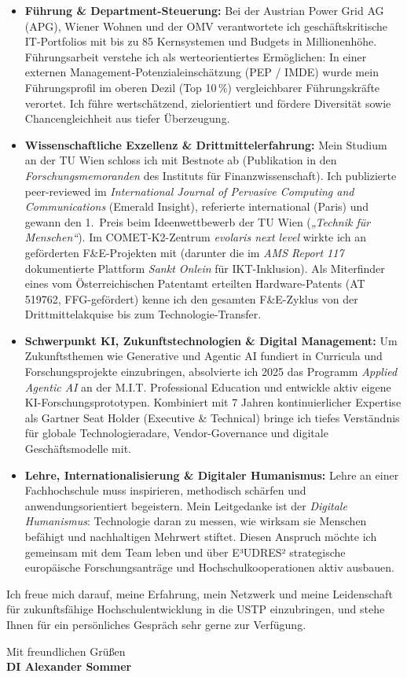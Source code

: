 \documentclass[10.5pt]{article}
\begin{document}
\begin{itemize}\setlength{\itemsep}{1.5pt}\setlength{\parskip}{0pt}
  \item \textbf{Führung \& Department-Steuerung:} Bei der Austrian Power Grid AG (APG), Wiener Wohnen und der OMV verantwortete ich geschäftskritische IT-Portfolios mit bis zu 85 Kernsystemen und Budgets in Millionenhöhe. Führungsarbeit verstehe ich als werteorientiertes Ermöglichen: In einer externen Management-Potenzialeinschätzung (PEP / IMDE) wurde mein Führungsprofil im oberen Dezil (Top 10\,\%) vergleichbarer Führungskräfte verortet. Ich führe wertschätzend, zielorientiert und fördere Diversität sowie Chancengleichheit aus tiefer Überzeugung.

  \item \textbf{Wissenschaftliche Exzellenz \& Drittmittelerfahrung:} Mein Studium an der TU Wien schloss ich mit Bestnote ab (Publikation in den \emph{Forschungsmemoranden} des Instituts für Finanzwissenschaft). Ich publizierte peer-reviewed im \emph{International Journal of Pervasive Computing and Communications} (Emerald Insight), referierte international (Paris) und gewann den 1.~Preis beim Ideenwettbewerb der TU Wien (\emph{„Technik für Menschen“}). Im COMET-K2-Zentrum \emph{evolaris next level} wirkte ich an geförderten F\&E-Projekten mit (darunter die im \emph{AMS Report 117} dokumentierte Plattform \emph{Sankt Onlein} für IKT-Inklusion). Als Miterfinder eines vom Österreichischen Patentamt erteilten Hardware-Patents (AT 519762, FFG-gefördert) kenne ich den gesamten F\&E-Zyklus von der Drittmittelakquise bis zum Technologie-Transfer.

  \item \textbf{Schwerpunkt KI, Zukunftstechnologien \& Digital Management:} Um Zukunftsthemen wie Generative und Agentic AI fundiert in Curricula und Forschungsprojekte einzubringen, absolvierte ich 2025 das Programm \emph{Applied Agentic AI} an der M.I.T. Professional Education und entwickle aktiv eigene KI-Forschungsprototypen. Kombiniert mit 7 Jahren kontinuierlicher Expertise als Gartner Seat Holder (Executive \& Technical) bringe ich tiefes Verständnis für globale Technologieradare, Vendor-Governance und digitale Geschäftsmodelle mit.

  \item \textbf{Lehre, Internationalisierung \& Digitaler Humanismus:} Lehre an einer Fachhochschule muss inspirieren, methodisch schärfen und anwendungsorientiert begeistern. Mein Leitgedanke ist der \emph{Digitale Humanismus}: Technologie daran zu messen, wie wirksam sie Menschen befähigt und nachhaltigen Mehrwert stiftet. Diesen Anspruch möchte ich gemeinsam mit dem Team leben und über E³UDRES² strategische europäische Forschungsanträge und Hochschulkooperationen aktiv ausbauen.
\end{itemize}

Ich freue mich darauf, meine Erfahrung, mein Netzwerk und meine Leidenschaft für zukunftsfähige Hochschulentwicklung in die USTP einzubringen, und stehe Ihnen für ein persönliches Gespräch sehr gerne zur Verfügung.

\vspace{6pt}
Mit freundlichen Grüßen\\[16pt]
\textbf{DI Alexander Sommer}
\end{document}
